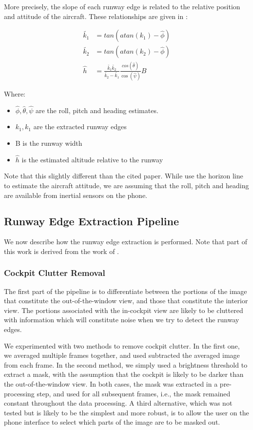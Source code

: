 \documentclass[letterpaper, conference]{IEEEtran}  %
\begin{document}
More precisely, the slope of each runway edge is related to the relative position and attitude of the aircraft. These relationships are given in \cite{Sasa2000}:

\begin{align}
\tilde{k_1} &= tan(atan(k_1) - \hat{\phi}) \\
\tilde{k_2} &= tan(atan(k_2) - \hat{\phi}) \\
\hat{h} &= \frac{\tilde{k_1} \tilde{k_2}}{\tilde{k_2} - \tilde{k_1}} \frac{cos(\hat{\theta})}{\cos(\hat{\psi})} B \label{eq:slope}
\end{align}

Where:
\begin{itemize}
\item $\hat{\phi}, \hat{\theta}, \hat{\psi}$ are the roll, pitch and heading estimates.
\item $k_1, k_1$ are the extracted runway edges
\item B is the runway width
\item $\hat{h}$ is the estimated altitude relative to the runway
\end{itemize}

Note that this slightly different than the cited paper. While \citeauthor{Sasa2000} use the horizon line to estimate the aircraft attitude, we are assuming that the roll, pitch and heading are available from inertial sensors on the phone.

\subsection{Runway Edge Extraction Pipeline}
We now describe how the runway edge extraction is performed. Note that part of this work is derived from the work of \cite{Naidu2011}.
\subsubsection*{\textbf{Cockpit Clutter Removal}}
\label{sec:pipeline:msk}
The first part of the pipeline is to differentiate between the portions of the image that constitute the out-of-the-window view, and those that constitute the interior view. The portions associated with the in-cockpit view are likely to be cluttered with information which will constitute noise when we try to detect the runway edges.

We experimented with two methods to remove cockpit clutter. In the first one, we averaged multiple frames together, and used subtracted the averaged image from each frame. In the second method, we simply used a brightness threshold to extract a mask, with the assumption that the cockpit is likely to be darker than the out-of-the-window view. In both cases, the mask was extracted in a pre-processing step, and used for all subsequent frames, i.e., the mask remained constant throughout the data processing.
A third alternative, which was not tested but is likely to be the simplest and more robust, is to allow the user on the phone interface to select which parts of the image are to be masked out.
\end{document}
